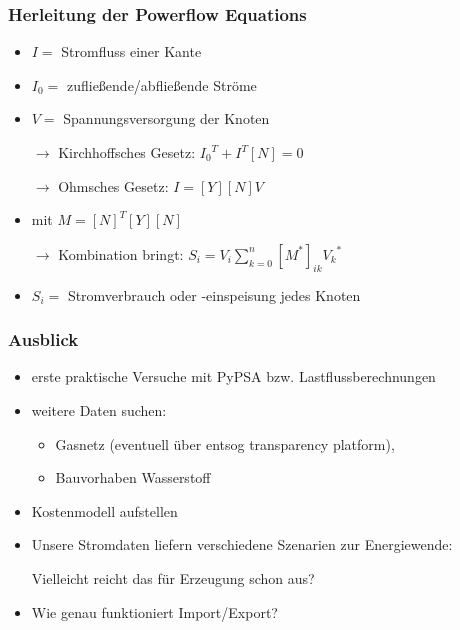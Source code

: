\documentclass[aspectratio=169,t]{beamer}
\begin{document}
\begin{frame}
	
		\frametitle{Herleitung der Powerflow Equations}
		
		\vspace*{2mm}
	 
	 \begin{itemize}
	 	\item $I =$ Stromfluss einer Kante
	 	
	 	\item $I_0 =$ zufließende/abfließende Ströme
	 	
	 	\item $V =$ Spannungsversorgung der Knoten
	 	
	 	\item [$\rightarrow$] Kirchhoffsches Gesetz: ${I_0}^{T} + I^{T}[N] = 0$
	 	
	 	\item [$\rightarrow$] Ohmsches Gesetz: $ I = [Y][N]V$
	 	
	 	\item mit $M = [N]^T[Y][N]$
	 	
	 	\vspace{2mm}
	 	
	 	\item [$\rightarrow$] Kombination bringt: $ S_i = V_i \displaystyle \sum_{k=0} ^{n} [M^*]_{ik} {V_k}^*$
	 	
	 	\item $S_i =$ Stromverbrauch oder -einspeisung jedes Knoten
	 	
	 \end{itemize}
	
		\vspace*{0mm}
	\end{frame}

	
	
	\begin{frame}
		\frametitle{Ausblick}
		
		\vspace*{6mm}
		\begin{itemize}
			\item erste praktische Versuche mit PyPSA bzw. Lastflussberechnungen
			\item weitere Daten suchen:
			\begin{itemize}
				\item Gasnetz (eventuell über entsog transparency platform),
				\item Bauvorhaben Wasserstoff
			\end{itemize}
			\item Kostenmodell aufstellen
			\item Unsere Stromdaten liefern verschiedene Szenarien zur Energiewende:
			
			Vielleicht reicht das für Erzeugung schon aus? 
			\item Wie genau funktioniert Import/Export?
		\end{itemize}
			
		
	\end{frame}
	
	
	
	
	
	
	
\end{document}

